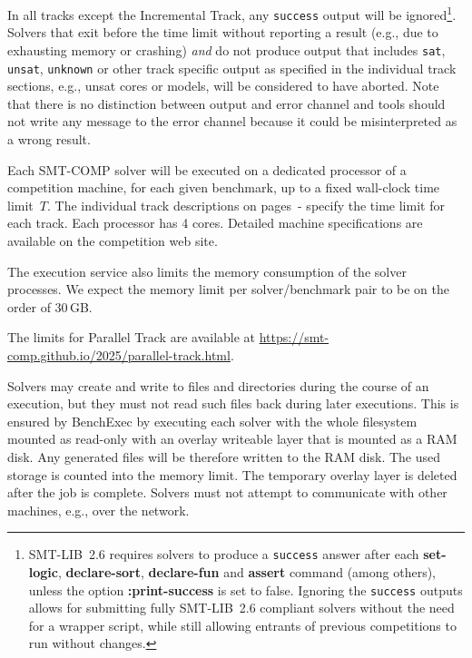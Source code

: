 \documentclass[12pt]{article}
\newcommand{\akey}[1]{\textbf{#1}\xspace}
\newcommand{\inctrack}{Incremental Track\xspace}
\newcommand{\paralleltrack}{Parallel Track\xspace}
\newcommand{\executionservice}{execution service\xspace}
\begin{document}
%
In all tracks except the \inctrack, any \texttt{success} output will be
ignored\footnote{SMT-LIB~2.6 requires solvers to produce a \texttt{success}
  answer after each \akey{set-logic}, \akey{declare-sort}, \akey{declare-fun}
  and \akey{assert} command (among others), unless the option
  \akey{:print-success} is set to false.  Ignoring the \texttt{success} outputs
  allows for submitting fully SMT-LIB~2.6 compliant solvers without the need for
  a wrapper script, while still allowing entrants of previous competitions to
  run without changes.}.  Solvers that exit before the time limit without
reporting a result (e.g., due to exhausting memory or crashing) \emph{and} do
not produce output that includes \texttt{sat}, \texttt{unsat}, \texttt{unknown}
or other track specific output as specified in the individual track sections,
e.g., unsat cores or models, will be considered to have aborted.  Note that there
is no distinction between output and error channel and tools should not write
any message to the error channel because it could be misinterpreted as a wrong
result.

%
Each SMT-COMP solver will be executed on a dedicated processor of a
competition machine, for each given benchmark, up to a fixed
wall-clock time limit~$T$. The individual track descriptions on
pages~\pageref{sec:exec:single}-\pageref{sec:exec:model} specify
the time limit for each track. Each processor has 4 cores.  Detailed
machine specifications are available on the competition web site.

The \executionservice also limits the memory consumption of the solver
processes.  We expect the memory limit per solver/benchmark pair to be
on the order of 30\,GB.

The limits for \paralleltrack{} are available at
\url{https://smt-comp.github.io/2025/parallel-track.html}.

%
Solvers may create and write to files and directories during the
course of an execution, but they must not read such files back during
later executions. This is ensured by BenchExec by executing each solver
with the whole filesystem mounted as read-only with an overlay writeable
layer that is mounted as a RAM disk. Any generated files will be therefore
written to the RAM disk. The used storage is counted into the
memory limit. The temporary overlay layer is deleted after the job is complete.
Solvers must not attempt to communicate with other machines, e.g., over the network.
\end{document}
